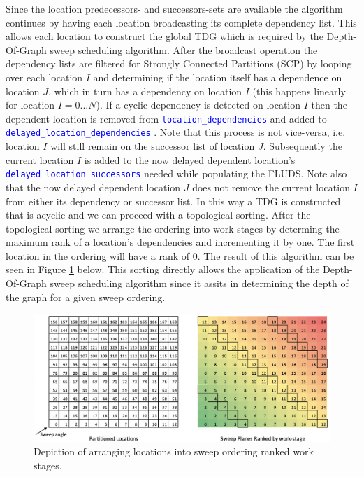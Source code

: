 \documentclass[11pt,letterpaper,titlepage]{article}
\newcommand{\xmltag}[1]{\textcolor{blue}{ \texttt{#1}} }
\numberwithin{equation}{section}
\begin{document}
Since the location predecessors- and successors-sets are available the algorithm continues by having each location broadcasting its complete dependency list. This allows each location to construct the global TDG which is required by the Depth-Of-Graph sweep scheduling algorithm. After the broadcast operation the dependency lists are filtered for Strongly Connected Partitions (SCP) by looping over each location $I$ and determining if the location itself has a dependence on location $J$, which in turn has a dependency on location $I$ (this happens linearly for location $I=0...N$). If a cyclic dependency is detected on location $I$ then the dependent location is removed from \xmltag{location\_dependencies} and added to \xmltag{delayed\_location\_dependencies}. Note that this process is not vice-versa, i.e. location $I$ will still remain on the successor list of location $J$. Subsequently the current location $I$ is added to the now delayed dependent location's \xmltag{delayed\_location\_successors} needed while populating the FLUDS. Note also that the now delayed dependent location $J$ does not remove the current location $I$ from either its dependency or successor list. In this way a TDG is constructed that is acyclic and we can proceed with a topological sorting.
\newline
\newline
After the topological sorting we arrange the ordering into work stages by determing the maximum rank of a location's dependencies and incrementing it by one. The first location in the ordering will have a rank of 0. The result of this algorithm can be seen in Figure \ref{fig:workstages} below. This sorting directly allows the application of the Depth-Of-Graph sweep scheduling algorithm since it assits in determining the depth of the graph for a given sweep ordering.

\begin{figure}[H]
\centering
\includegraphics[width=0.9\linewidth]{Figures/WorkStages}
\caption{Depiction of arranging locations into sweep ordering ranked work stages.}
\label{fig:workstages}
\end{figure}
\end{document}
